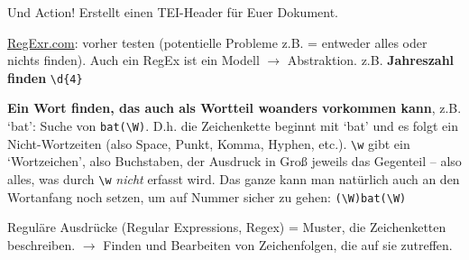 %


\begin{frame}[standout]
  \alert{Und Action!} \normalsize
 Erstellt einen TEI-Header für Euer Dokument.
\end{frame}






\href{http://regexr.com}{RegExr.com}: vorher testen (potentielle Probleme z.B. = entweder alles oder nichts finden).
Auch ein RegEx ist ein Modell $\to$ Abstraktion. z.B. \textbf{Jahreszahl finden} \verb|\d{4}|
\smallskip

\textbf{Ein Wort finden, das auch als Wortteil woanders vorkommen kann}, z.B. `bat': Suche von \verb|bat(\W)|. D.h. die Zeichenkette beginnt mit `bat' und es folgt ein Nicht-Wortzeiten (also Space, Punkt, Komma, Hyphen, etc.). \verb|\w| gibt ein `Wortzeichen', also Buchstaben, der Ausdruck in Groß jeweils das Gegenteil -- also alles, was durch \verb|\w| \emph{nicht} erfasst wird.
Das ganze kann man natürlich auch an den Wortanfang noch setzen, um auf Nummer sicher zu gehen: \verb|(\W)bat(\W)|
\smallskip

Reguläre Ausdrücke (Regular Expressions, Regex) = Muster, die Zeichenketten beschreiben. 
$\to$ Finden und Bearbeiten von Zeichenfolgen, die auf sie zutreffen.

